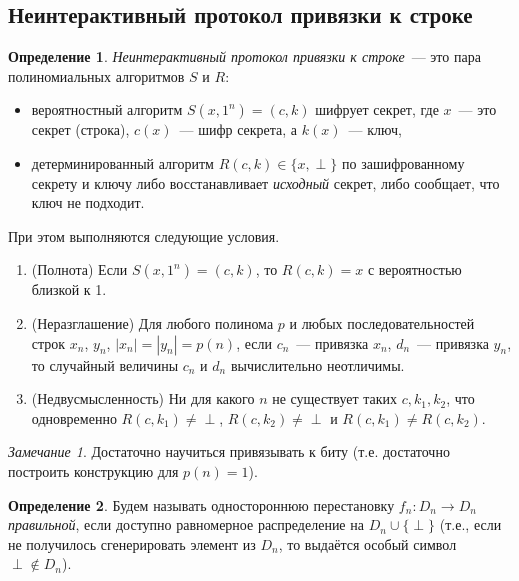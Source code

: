 \documentclass[12pt,a4paper]{article}
\theoremstyle{definition}
\newtheorem{definition}{Определение}[section]
\theoremstyle{plain}
\theoremstyle{remark}
\newtheorem{remark}{Замечание}[section]
\begin{document}
\subsection{Неинтерактивный протокол привязки к строке}
\begin{definition}
\emph{Неинтерактивный протокол привязки к строке}~--- это пара полиномиальных алгоритмов $S$ и $R$:
\begin{itemize}
\item вероятностный алгоритм $S(x, 1^n) = (c, k)$ шифрует секрет, где $x$~--- это секрет (строка), 
$c(x)$~--- шифр секрета, а $k(x)$~--- ключ,
\item детерминированный алгоритм $R(c, k) \in \{x,\perp\}$ по зашифрованному секрету и ключу либо восстанавливает 
\emph{исходный} секрет, либо сообщает, что ключ не подходит.
\end{itemize}
При этом выполняются следующие условия.
\begin{enumerate}
\item (Полнота) Если $S(x, 1^n) = (c, k)$, то $R(c, k) = x$ с вероятностью близкой к 1.
\item (Неразглашение) Для любого полинома $p$ и любых последовательностей строк $x_n$, $y_n$,
$|x_n|=|y_n|=p(n)$, если $c_n$~--- привязка $x_n$, $d_n$~--- привязка $y_n$,
то случайный величины $c_n$ и $d_n$ вычислительно неотличимы.
\item (Недвусмысленность) Ни для какого $n$ не существует таких $c, k_1, k_2$, что одновременно $R(c, k_1)\neq \perp$, $R(c, k_2)\neq \perp$
и $R(c, k_1)\neq R(c, k_2)$.
\end{enumerate}
\end{definition}

\begin{remark}
Достаточно научиться привязывать к биту (т.е. достаточно построить конструкцию для $p(n) = 1$).
\end{remark}

\begin{definition}
Будем называть одностороннюю перестановку $f_n : D_n\to D_n$ \emph{правильной},
если доступно равномерное распределение на $D_n\cup \{\perp\}$ (т.е., если не
получилось сгенерировать элемент из $D_n$, то выдаётся особый символ $\perp\not\in D_n$).
\end{definition}
\end{document}
